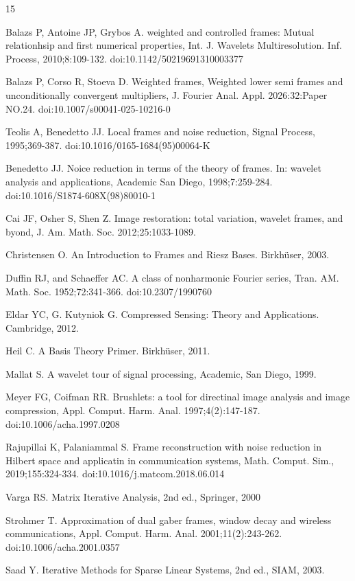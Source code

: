\documentclass[12pt,titlepage]{amsart}
\theoremstyle{definition}
\theoremstyle{remark}
\begin{document}
\begin{thebibliography}{15}

Balazs P, Antoine JP, Grybos A. weighted and controlled frames:
Mutual relationhsip and first numerical properties, Int. J.
Wavelets Multiresolution. Inf. Process, 2010;8:109-132.
doi:10.1142/50219691310003377

Balazs P, Corso R, Stoeva D. Weighted frames, Weighted lower semi
frames and unconditionally convergent multipliers, J. Fourier
Anal. Appl. 2026:32:Paper NO.24. doi:10.1007/s00041-025-10216-0

Teolis A, Benedetto JJ. Local frames and noise reduction, Signal
Process, 1995;369-387. doi:10.1016/0165-1684(95)00064-K

Benedetto JJ. Noice reduction in terms of the theory of frames.
In: wavelet analysis and applications, Academic San Diego,
1998;7:259-284. doi:10.1016/S1874-608X(98)80010-1

Cai JF, Osher S, Shen Z. Image restoration: total variation,
wavelet frames, and byond, J. Am. Math. Soc. 2012;25:1033-1089.


Christensen O. An Introduction to Frames and Riesz Bases.
Birkh\"user, 2003.

Duffin RJ, and Schaeffer AC. A class of nonharmonic Fourier
series, Tran. AM. Math. Soc. 1952;72:341-366. doi:10.2307/1990760

Eldar YC, G. Kutyniok G. Compressed Sensing: Theory and
Applications. Cambridge, 2012.

Heil C. A Basis Theory Primer. Birkh\"user, 2011.

Mallat S. A wavelet tour of signal processing, Academic, San
Diego, 1999.

Meyer FG, Coifman RR. Brushlets: a tool for directinal image
analysis and image compression, Appl. Comput. Harm. Anal.
1997;4(2):147-187. doi:10.1006/acha.1997.0208

Rajupillai K, Palaniammal S. Frame reconstruction with noise
reduction in Hilbert space and applicatin in communication
systems, Math. Comput. Sim., 2019;155:324-334.
doi:10.1016/j.matcom.2018.06.014

Varga RS. Matrix Iterative Analysis, 2nd ed., Springer, 2000

Strohmer T. Approximation of dual gaber frames, window decay and
wireless communications, Appl. Comput. Harm. Anal.
2001;11(2):243-262. doi:10.1006/acha.2001.0357

Saad Y. Iterative Methods for Sparse Linear Systems, 2nd ed.,
SIAM, 2003.

\end{thebibliography}
%

\end{document}

